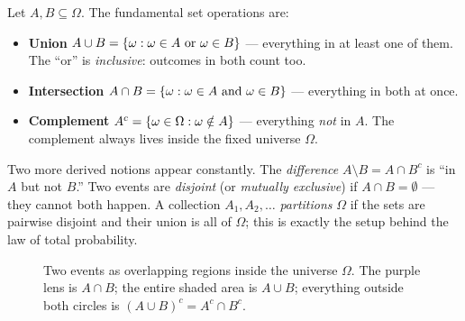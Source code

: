 Let $A, B \subseteq \Omega$. The fundamental set operations are:
\begin{itemize}
  \item \textbf{Union} $A \cup B = \{\omega : \omega \in A \text{ or }
        \omega \in B\}$ --- everything in at least one of them. The ``or'' is
        \emph{inclusive}: outcomes in both count too.
  \item \textbf{Intersection} $A \cap B = \{\omega : \omega \in A \text{
        and } \omega \in B\}$ --- everything in both at once.
  \item \textbf{Complement} $A^c = \{\omega \in \Omega : \omega \notin A\}$
        --- everything \emph{not} in $A$. The complement always lives inside
        the fixed universe $\Omega$.
\end{itemize}
Two more derived notions appear constantly. The \emph{difference}
$A \setminus B = A \cap B^c$ is ``in $A$ but not $B$.'' Two events are
\emph{disjoint} (or \emph{mutually exclusive}) if $A \cap B = \emptyset$ ---
they cannot both happen. A collection $A_1, A_2, \dots$ \emph{partitions}
$\Omega$ if the sets are pairwise disjoint and their union is all of $\Omega$;
this is exactly the setup behind the law of total probability.

\begin{figure}[H]
\centering
{}
\caption{Two events as overlapping regions inside the universe $\Omega$. The
purple lens is $A \cap B$; the entire shaded area is $A \cup B$; everything
outside both circles is $(A \cup B)^c = A^c \cap B^c$.}
\label{ch39:venn}
\end{figure}

